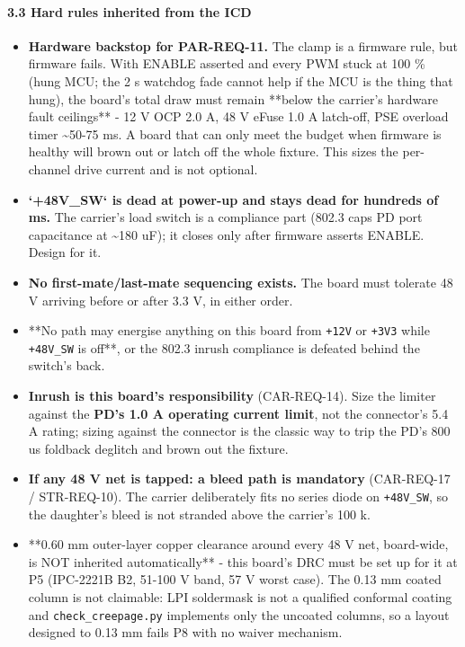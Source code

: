 \documentclass[11pt,a4paper]{article}
\begin{document}
\paragraph*{3.3 Hard rules inherited from the ICD}
\begin{itemize}
\item \textbf{Hardware backstop for PAR-REQ-11.} The clamp is a firmware rule, but
firmware fails. With ENABLE asserted and every PWM stuck at 100 \% (hung MCU;
the 2 s watchdog fade cannot help if the MCU is the thing that hung), the
board's total draw must remain {*}{*}below the carrier's hardware fault
ceilings{*}{*} - 12 V OCP 2.0 A, 48 V eFuse 1.0 A latch-off, PSE overload timer
\textasciitilde{}50-75 ms. A board that can only meet the budget when firmware is healthy
will brown out or latch off the whole fixture. This sizes the per-channel
drive current and is not optional.
\item \textbf{`+48V\_SW` is dead at power-up and stays dead for hundreds of ms.} The
carrier's load switch is a compliance part (802.3 caps PD port capacitance at
\textasciitilde{}180 uF); it closes only after firmware asserts ENABLE. Design for it.
\item \textbf{No first-mate/last-mate sequencing exists.} The board must tolerate 48 V
arriving before or after 3.3 V, in either order.
\item {*}{*}No path may energise anything on this board from \texttt{+12V} or \texttt{+3V3} while
\texttt{+48V\_SW} is off{*}{*}, or the 802.3 inrush compliance is defeated behind the
switch's back.
\item \textbf{Inrush is this board's responsibility} (CAR-REQ-14). Size the limiter
against the \textbf{PD's 1.0 A operating current limit}, not the connector's
5.4 A rating; sizing against the connector is the classic way to trip the
PD's 800 us foldback deglitch and brown out the fixture.
\item \textbf{If any 48 V net is tapped: a bleed path is mandatory} (CAR-REQ-17 /
STR-REQ-10). The carrier deliberately fits no series diode on \texttt{+48V\_SW}, so
the daughter's bleed is not stranded above the carrier's 100 k.
\item {*}{*}0.60 mm outer-layer copper clearance around every 48 V net, board-wide,
is NOT inherited automatically{*}{*} - this board's DRC must be set up for it at
P5 (IPC-2221B B2, 51-100 V band, 57 V worst case). The 0.13 mm coated column
is not claimable: LPI soldermask is not a qualified conformal coating and
\texttt{check\_creepage.py} implements only the uncoated columns, so a layout
designed to 0.13 mm fails P8 with no waiver mechanism.
\end{itemize}
\end{document}
